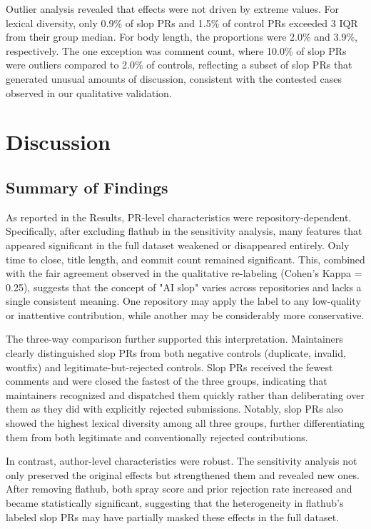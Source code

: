 \documentclass[11pt]{article}
\begin{document}
	Outlier analysis revealed that effects were not driven by extreme values. For lexical diversity, only 0.9\% of slop PRs and 1.5\% of control PRs exceeded 3 IQR from their group median. For body length, the proportions were 2.0\% and 3.9\%, respectively. The one exception was comment count, where 10.0\% of slop PRs were outliers compared to 2.0\% of controls, reflecting a subset of slop PRs that generated unusual amounts of discussion, consistent with the contested cases observed in our qualitative validation.
	
	
	\section{Discussion}
	\subsection{Summary of Findings}
	As reported in the Results, PR-level characteristics were repository-dependent. Specifically, after excluding flathub in the sensitivity analysis, many features that appeared significant in the full dataset weakened or disappeared entirely. Only time to close, title length, and commit count remained significant. This, combined with the fair agreement observed in the qualitative re-labeling (Cohen's Kappa = 0.25), suggests that the concept of "AI slop" varies across repositories and lacks a single consistent meaning. One repository may apply the label to any low-quality or inattentive contribution, while another may be considerably more conservative.
	
	The three-way comparison further supported this interpretation. Maintainers clearly distinguished slop PRs from both negative controls (duplicate, invalid, wontfix) and legitimate-but-rejected controls. Slop PRs received the fewest comments and were closed the fastest of the three groups, indicating that maintainers recognized and dispatched them quickly rather than deliberating over them as they did with explicitly rejected submissions. Notably, slop PRs also showed the highest lexical diversity among all three groups, further differentiating them from both legitimate and conventionally rejected contributions.
	
	In contrast, author-level characteristics were robust. The sensitivity analysis not only preserved the original effects but strengthened them and revealed new ones. After removing flathub, both spray score and prior rejection rate increased and became statistically significant, suggesting that the heterogeneity in flathub's labeled slop PRs may have partially masked these effects in the full dataset.
	
\end{document}
